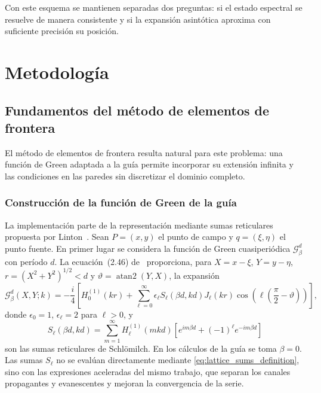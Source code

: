 \documentclass[11pt]{article}
\begin{document}
Con este esquema se mantienen separadas dos preguntas: si el estado espectral se resuelve de manera consistente y si la expansión asintótica aproxima con suficiente precisión su posición.

\section{Metodología}

\subsection{Fundamentos del método de elementos de frontera}

El método de elementos de frontera \cite{Pozrikidis2002} resulta natural para este problema: una función de Green adaptada a la guía permite incorporar su extensión infinita y las condiciones en las paredes sin discretizar el dominio completo.

\subsubsection{Construcción de la función de Green de la guía}

La implementación parte de la representación mediante sumas reticulares propuesta por
Linton~\cite{Linton1998Green}. Sean
\(P=(x,y)\) el punto de campo y \(q=(\xi,\eta)\) el punto fuente. En primer lugar se
considera la función de Green cuasiperiódica \(\mathcal G_\beta^d\) con período \(d\).
La ecuación~(2.46) de~\cite{Linton1998Green} proporciona, para
\(X=x-\xi\), \(Y=y-\eta\), \(r=(X^2+Y^2)^{1/2}<d\) y
\(\vartheta=\operatorname{atan2}(Y,X)\), la expansión
\begin{equation}
\mathcal G_\beta^d(X,Y;k)
=
-\frac{i}{4}
\left[
H_0^{(1)}(kr)
+
\sum_{\ell=0}^{\infty}
\epsilon_\ell S_\ell(\beta d,kd)
J_\ell(kr)
\cos\!\left(\ell\left(\frac{\pi}{2}-\vartheta\right)\right)
\right],
\label{eq:periodic_green_lattice}
\end{equation}
donde \(\epsilon_0=1\), \(\epsilon_\ell=2\) para \(\ell>0\), y
\begin{equation}
S_\ell(\beta d,kd)
=
\sum_{m=1}^{\infty}
H_\ell^{(1)}(mkd)
\left[
e^{im\beta d}
+(-1)^\ell e^{-im\beta d}
\right]
\label{eq:lattice_sums_definition}
\end{equation}
son las sumas reticulares de Schlömilch. En los cálculos de la guía se toma
\(\beta=0\). Las sumas \(S_\ell\) no se evalúan directamente mediante
\eqref{eq:lattice_sums_definition}, sino con las expresiones aceleradas del mismo trabajo,
que separan los canales propagantes y evanescentes y mejoran la convergencia de la serie.
\end{document}

